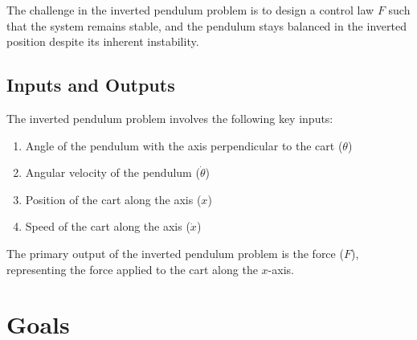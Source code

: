\documentclass{article}
\begin{document}
The challenge in the inverted pendulum problem is to design
a control law \(F\) such that the system remains stable,
and the pendulum stays balanced in the inverted position
despite its inherent instability.


\subsection{Inputs and Outputs}

The inverted pendulum problem involves the following key inputs:
\begin{enumerate}
    \item Angle of the pendulum with the axis perpendicular to the cart (\(\theta\))
    \item Angular velocity of the pendulum (\(\dot{\theta}\))
    \item Position of the cart along the axis (\(x\))
    \item Speed of the cart along the axis (\(\dot{x}\))
\end{enumerate}

The primary output of the inverted pendulum problem is the force (\(F\)),
representing the force applied to the cart along the \(x\)-axis.






\section{Goals}
\end{document}
